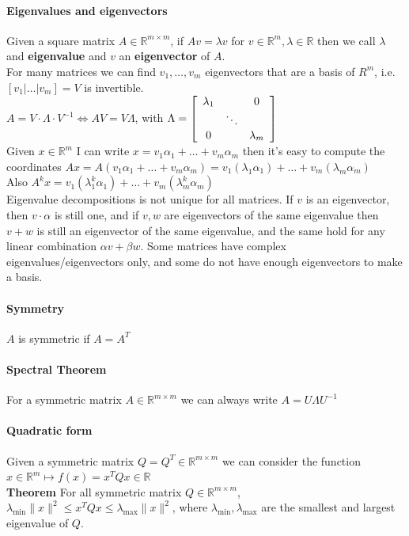 \documentclass[10pt]{report}
\begin{document}
\paragraph{Eigenvalues and eigenvectors} Given a square matrix $A\in \mathbb{R}^{m\times m}$, if $Av = \lambda v$ for $v\in \mathbb{R}^m, \lambda\in \mathbb{R}$ then we call $\lambda$ and \textbf{eigenvalue} and $v$ an \textbf{eigenvector} of $A$.\\
For many matrices we can find $v_1,\ldots,v_m$ eigenvectors that are a basis of $R^m$, i.e. $[v_1|\ldots|v_m] = V$ is invertible.\\
$A = V\cdot\Lambda\cdot V^{-1}\Leftrightarrow AV = V\Lambda$, with $\Lambda = \left[\begin{array}{c c c}
\lambda_1 & & 0\\
& \ddots \\
0& & \lambda_m
\end{array}\right]$\\
Given $x\in \mathbb{R}^m$ I can write $x = v_1\alpha_1 + \ldots + v_m\alpha_m$ then it's easy to compute the coordinates $Ax = A(v_1\alpha_1 + \ldots + v_m\alpha_m) = v_1(\lambda_1\alpha_1) + \ldots + v_m(\lambda_m\alpha_m)$\\
Also $A^kx = v_1(\lambda_1^k\alpha_1) + \ldots + v_m(\lambda_m^k\alpha_m)$\\
Eigenvalue decompositions is not unique for all matrices. If $v$ is an eigenvector, then $v\cdot\alpha$ is still one, and if $v,w$ are eigenvectors of the same eigenvalue then $v+w$ is still an eigenvector of the same eigenvalue, and the same hold for any linear combination $\alpha v+\beta w$. Some matrices have complex eigenvalues/eigenvectors only, and some do not have enough eigenvectors to make a basis.
\paragraph{Symmetry} $A$ is symmetric if $A = A^T$
\paragraph{Spectral Theorem} For a symmetric matrix $A\in \mathbb{R}^{m\times m}$ we can always write $A = U\Lambda U^{-1}$
\paragraph{Quadratic form} Given a symmetric matrix $Q = Q^T \in \mathbb{R}^{m\times m}$ we can consider the function $x\in \mathbb{R}^m\mapsto f(x) = x^T Qx \in \mathbb{R}$\\
\textbf{Theorem} For all symmetric matrix $Q \in \mathbb{R}^{m\times m}$, $\lambda_{\min}\|x\|^2 \leq x^TQx\leq \lambda_{\max}\|x\|^2$, where $\lambda_{\min}, \lambda_{\max}$ are the smallest and largest eigenvalue of $Q$.
\end{document}
